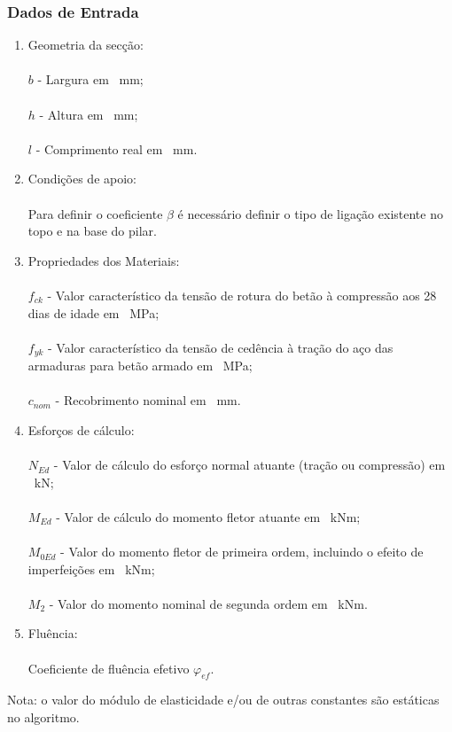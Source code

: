 \subsubsection{Dados de Entrada}
\begin{enumerate}
    \item Geometria da secção:\\\\
    $b$ - Largura em \SI{}{mm};\\\\
    $h$ - Altura em \SI{}{mm};\\\\
    $l$ - Comprimento real em \SI{}{mm}.
    \item Condições de apoio:\\\\
    Para definir o coeficiente $\beta$ é necessário definir o tipo de ligação existente no topo e na base do pilar.
    \item Propriedades dos Materiais: \\\\
    $f_{ck}$ - Valor característico da tensão de rotura do betão à compressão aos 28 dias de idade em \SI{}{MPa};\\\\ 
    $f_{yk}$ - Valor característico da tensão de cedência à tração do aço das armaduras para betão armado em \SI{}{MPa};\\\\ 
    $c_{nom}$ - Recobrimento nominal em \SI{}{mm}.
    \item Esforços de cálculo:\\\\
    $N_{Ed}$ - Valor  de cálculo do esforço normal atuante (tração ou compressão) em \SI{}{kN};\\\\
    $M_{Ed}$ - Valor  de cálculo do momento fletor atuante em \SI{}{kNm};\\\\
    $M_{0Ed}$ - Valor do momento fletor de primeira ordem, incluindo o efeito de imperfeições em \SI{}{kNm};\\\\
    $M_{2}$ - Valor do momento nominal de segunda ordem em \SI{}{kNm}.\\
    \item Fluência:\\\\
    Coeficiente de fluência efetivo $\varphi_{ef}$.
\end{enumerate}
Nota: o valor do módulo de elasticidade e/ou de outras constantes são estáticas no algoritmo.

